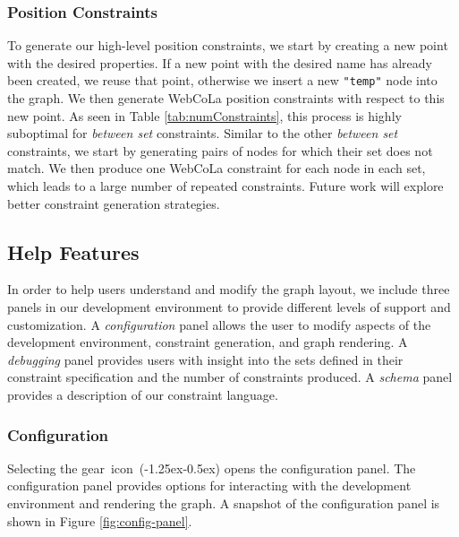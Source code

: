 {\subsubsection{Position Constraints}
To generate our high-level position constraints, we start by creating a new point with the desired properties. If a new point with the desired name has already been created, we reuse that point, otherwise we insert a new \texttt{"temp"} node into the graph. We then generate WebCoLa position constraints with respect to this new point. As seen in Table \ref{tab:numConstraints}, this process is highly suboptimal for \emph{between set} constraints. Similar to the other \emph{between set} constraints, we start by generating pairs of nodes for which their set does not match. We then produce one WebCoLa constraint for each node in each set, which leads to a large number of repeated constraints. Future work will explore better constraint generation strategies.

\subsection{Help Features}
In order to help users understand and modify the graph layout, we include three panels in our development environment to provide different levels of support and customization. A \emph{configuration} panel allows the user to modify aspects of the development environment, constraint generation, and graph rendering. A \emph{debugging} panel provides users with insight into the sets defined in their constraint specification and the number of constraints produced. A \emph{schema} panel provides a description of our constraint language.

\subsubsection{Configuration}
\configurationPanel
Selecting the \mbox{gear icon (\kern-1.25ex\kern-0.5ex)} opens the configuration panel. The configuration panel provides options for interacting with the development environment and rendering the graph. A snapshot of the configuration panel is shown in Figure \ref{fig:config-panel}.

}
